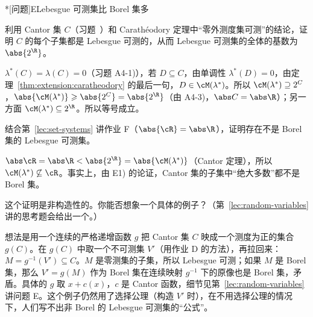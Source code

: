 \begin{probleme}*[问题]{E}{Lebesgue 可测集比 Borel 集多}
\begin{questions}
\item 利用 Cantor 集 $C$（习题~）和 Carathéodory 定理中“零外测度集可测”的结论，证明 $C$ 的每个子集都是 Lebesgue 可测的，从而 Lebesgue 可测集的全体的基数为 $\abs{2^\R}$。
\begin{solution}
$\lambda^*(C)=\lambda(C)=0$（习题 A4-1)），若 $D\subseteq C$，由单调性 $\lambda^*(D)=0$，由定理~\ref{thm:extension:caratheodory} 的最后一句，$D\in\cM(\lambda^*)$。所以 $\cM(\lambda^*)\supseteq2^C$，$\abs{\cM(\lambda^*)}\geqslant\abs{2^C}=\abs{2^\R}$（由 A4-3)，$\abs C=\abs\R$）；另一方面 $\cM(\lambda^*)\subseteq2^\R$。所以等号成立。
\end{solution}
\item 结合第~\ref{lec:set-systems} 讲作业 F（$\abs{\cR}=\abs\R$），证明存在不是 Borel 集的 Lebesgue 可测集。
\begin{solution}
$\abs\cR=\abs\R<\abs{2^\R}=\abs{\cM(\lambda^*)}$（Cantor 定理），所以 $\cM(\lambda^*)\not\subseteq\cR$。事实上，由 E1) 的论证，Cantor 集的子集中“绝大多数”都不是 Borel 集。
\end{solution}
\item 这个证明是非构造性的。你能否想象一个具体的例子？（第~\ref{lec:random-variables} 讲的思考题会给出一个。）
\begin{solution}
想法是用一个连续的严格递增函数 $g$ 把 Cantor 集 $C$ 映成一个测度为正的集合 $g(C)$。在 $g(C)$ 中取一个不可测集 $V'$（用作业 D 的方法），再拉回来：$M=g^{-1}(V')\subseteq C$。$M$ 是零测集的子集，所以 Lebesgue 可测；如果 $M$ 是 Borel 集，那么 $V'=g(M)$ 作为 Borel 集在连续映射 $g^{-1}$ 下的原像也是 Borel 集，矛盾。具体的 $g$ 取 $x+c(x)$，$c$ 是 Cantor 函数，细节见第~\ref{lec:random-variables} 讲问题 E。这个例子仍然用了选择公理（构造 $V'$ 时），在不用选择公理的情况下，人们写不出非 Borel 的 Lebesgue 可测集的“公式”。
\end{solution}
\end{questions}
\end{probleme}


